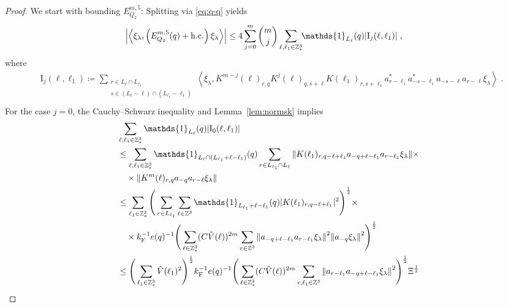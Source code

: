 \documentclass[12pt,a4paper]{article}
\numberwithin{equation}{section}
\newcommand{\1}{\mathbb{I}}
\newcommand{\F}{\mathrm{F}}
\newcommand{\I}{\mathrm{I}}
\newcommand{\Z}{\mathbb{Z}}
\newcommand{\half}{\frac{1}{2}}
\newcommand{\eva}[1]{\left\langle #1 \right\rangle}
\theoremstyle{plain}
\theoremstyle{definition}
\theoremstyle{remark}
\theoremstyle{plain}
\theoremstyle{definition}
\theoremstyle{remark}
\begin{document}
\begin{proof}
We start with bounding $ E^{m,5}_{Q_2} $: Splitting via \eqref{eq:q-q} yields
\begin{equation} \label{eq:EQ2131}
\begin{aligned}
	& \abs{\eva{\xi_\lambda,\left(E^{m,5}_{Q_2}(q) +\mathrm{h.c.}\right) \xi_\lambda }}
	\le 4 \sum_{j=0}^m {{m}\choose j} \sum_{\ell,\ell_1  \in \Z^3_*}\!\! \mathds{1}_{L_\ell}(q) |\I_j(\ell, \ell_1)| \;,
	\end{aligned}
\end{equation}
where
\begin{equation}
\begin{aligned}
	& \I_j(\ell, \ell_1)
	\coloneq \sum_{\substack{r\in L_{\ell} \cap L_{\ell_1}\\ s \in (L_{\ell} - \ell) \cap (L_{\ell_1} - \ell_1)}}
		\eva{\xi_\lambda, K^{m-j}(\ell)_{r,q} K^{j}(\ell)_{q,s+\ell} K(\ell_1)_{r,s+\ell_1} a^*_{r-\ell_1} a^*_{-s-\ell_1} a_{-s-\ell} a_{r-\ell} \xi_\lambda} \;. \\
\end{aligned}
\end{equation}
For the case $ j = 0 $, the Cauchy--Schwarz inequality and Lemma~\ref{lem:normsk} implies
\begin{align}
	&\sum_{\ell,\ell_1 \in \Z^3_*} \mathds{1}_{L_\ell}(q) |\I_0(\ell, \ell_1)| \nonumber\\
	&\leq \sum_{\ell,\ell_1 \in \Z^3_*} \mathds{1}_{L_\ell \cap (L_{\ell_1}+\ell-\ell_1)}(q) \sum\limits_{r\in L_{\ell_1} \cap L_\ell}
		\norm{ K(\ell_1)_{r,q-\ell+\ell_1} a_{-q+\ell-\ell_1} a_{r-\ell_1} \xi_\lambda} \times \nonumber\\
	&\quad \times \norm{ K^m(\ell)_{r,q} a_{-q}a_{r-\ell} \xi_\lambda } \nonumber\\
	&\leq \sum_{\ell_1 \in \Z^3_*}
		\Bigg( \sum_{r\in L_{\ell_1}} \sum_{\ell \in \Z^3} \mathds{1}_{L_{\ell_1}+\ell-\ell_1}(q) |K(\ell_1)_{r,q-\ell+\ell_1}|^2 \Bigg)^{\half} \times \nonumber\\
	&\quad \times k_{\F}^{-1} e(q)^{-1} \Bigg( \sum_{\ell \in \Z^3_*} (C \hat{V}(\ell))^{2m} \sum_{r\in \Z^3} \norm{a_{-q+\ell-\ell_1} a_{r-\ell_1} \xi_\lambda}^2
		\norm{ a_{-q} \xi_\lambda }^2 \Bigg)^{\half} \nonumber\\
	&\leq \Bigg( \sum_{\ell_1 \in \Z^3_*} \hat{V}(\ell_1)^2 \Bigg)^{\half} k_{\F}^{-1} e(q)^{-1}
		\Bigg( \sum_{\ell \in \Z^3_*} (C \hat{V}(\ell))^{2m} \sum_{r,\ell_1 \in \Z^3} \norm{a_{r-\ell_1} a_{-q+\ell-\ell_1} \xi_\lambda}^2 \Bigg)^{\half} \Xi^{\half} \nonumber\\

\end{align}
\end{proof}
\end{document}
